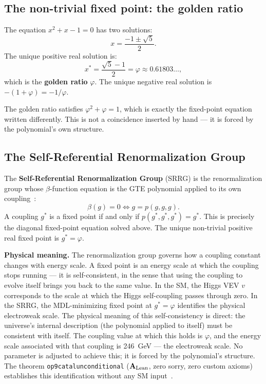 \documentclass[11pt,a4paper]{article}
\newcommand{\term}[1]{\textbf{#1}}
\newcommand{\lean}[1]{%
  \penalty-100
  \begingroup\def\_{\textunderscore\allowbreak}\texttt{#1}\endgroup}
\newcommand{\CatAL}{\ensuremath{\mathbf{A}_{\rm Lean}}}
\begin{document}
\subsection{The non-trivial fixed point: the golden ratio}

The equation $x^2 + x - 1 = 0$ has two solutions:
\[
  x = \frac{-1 \pm \sqrt{5}}{2}.
\]
The unique positive real solution is:
\[
  x^* = \frac{\sqrt{5}-1}{2} = \varphi \approx 0.61803\ldots,
\]
which is the \term{golden ratio} $\varphi$.
The unique negative real solution is $-(1+\varphi) = -1/\varphi$.

The golden ratio satisfies $\varphi^2 + \varphi = 1$,
which is exactly the fixed-point equation written differently.
This is not a coincidence inserted by hand --- it is forced by the polynomial's
own structure.

\subsection{The Self-Referential Renormalization Group}

The \term{Self-Referential Renormalization Group} (SRRG) is the renormalization
group whose $\beta$-function equation is the GTE polynomial applied to
its own coupling~\cite{SpivackSRRG}:
\[
  \beta(g) = 0 \iff g = p(g,g,g).
\]
A coupling $g^*$ is a fixed point if and only if $p(g^*,g^*,g^*) = g^*$.
This is precisely the diagonal fixed-point equation solved above.
The unique non-trivial positive real fixed point is $g^* = \varphi$.

\textbf{Physical meaning.}
The renormalization group governs how a coupling constant changes with energy scale.
A fixed point is an energy scale at which the coupling stops running --- it is
self-consistent, in the sense that using the coupling to evolve itself brings
you back to the same value.
In the SM, the Higgs VEV $v$ corresponds to the scale at which the
Higgs self-coupling passes through zero.
In the SRRG, the MDL-minimizing fixed point at $g^* = \varphi$ identifies
the physical electroweak scale.
The physical meaning of this self-consistency is direct: the universe's
internal description (the polynomial applied to itself) must be consistent with
itself.
The coupling value at which this holds is $\varphi$, and the energy scale
associated with that coupling is 246~GeV --- the electroweak scale.
No parameter is adjusted to achieve this; it is forced by the polynomial's structure.
The theorem \lean{op9\_catal\_unconditional} (\CatAL, zero sorry, zero custom axioms)
establishes this identification without any SM input~\cite{SpivackSRRG,SpivackGTECompleteFramework}.
\end{document}
